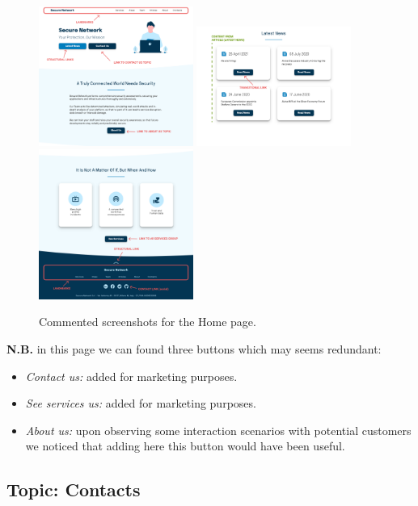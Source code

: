 \documentclass[12pt]{report}
\begin{document}
\begin{figure}[H]
	\centering
	\includegraphics[width=0.45\textwidth]{high_fid_wireframes/home/1.png}
	\includegraphics[width=0.45\textwidth]{high_fid_wireframes/home/2.png}
	\includegraphics[width=0.45\textwidth]{high_fid_wireframes/home/3.png}
	\caption{Commented screenshots for the Home page.}
\end{figure}
\textbf{N.B.} in this page we can found three buttons which may seems redundant:
\begin{itemize}
	\item \emph{Contact us:} added for marketing purposes.
	\item \emph{See services us:} added for marketing purposes.
	\item \emph{About us:} upon observing some interaction scenarios with 
	potential customers we noticed that adding here this button would have been useful.
\end{itemize}
\subsection{Topic: Contacts}
\end{document}
